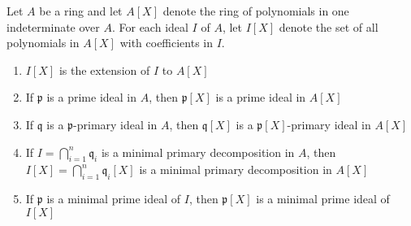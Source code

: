 \documentclass{solution}
\begin{document}
\begin{problem}
    Let $A$ be a ring and let $A[X]$ denote the ring of polynomials in one indeterminate over $A$. For each ideal $I$ of $A$, let $I[X]$ denote the set of all polynomials in $A[X]$ with coefficients in $I$.
    \begin{enumerate}
        \item $I[X]$ is the extension of $I$ to $A[X]$
        \item If $\mathfrak{p}$ is a prime ideal in $A$, then $\mathfrak{p}[X]$ is a prime ideal in $A[X]$
        \item If $\mathfrak{q}$ is a $\mathfrak{p}$-primary ideal in $A$, then $\mathfrak{q}[X]$ is a $\mathfrak{p}[X]$-primary ideal in $A[X]$
        \item If $I = \bigcap\limits_{i = 1}^{n} \mathfrak{q}_i$ is a minimal primary decomposition in $A$, then $I[X] = \bigcap\limits_{i = 1}^{n} \mathfrak{q}_i[X]$  is a minimal primary decomposition in $A[X]$
        \item If $\mathfrak{p}$ is a minimal prime ideal of $I$, then $\mathfrak{p}[X]$ is a minimal prime ideal of $I[X]$
    \end{enumerate}
\end{problem}
\end{document}
